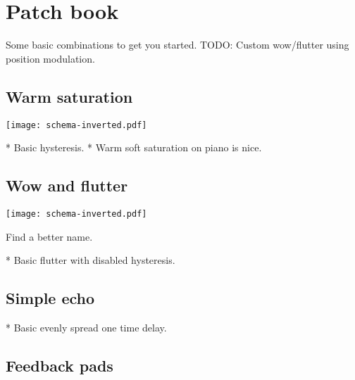 \documentclass[11pt]{article}
\begin{document}
\newpage

\section{Patch book}

Some basic combinations to get you started. TODO: Custom wow/flutter using position modulation.

\vspace{5mm}
\noindent
\begin{minipage}[t]{0.45\textwidth}

\subsection{Warm saturation}

\vspace{5mm}
\begin{center}
  \texttt{[image: schema-inverted.pdf]}
\end{center}

* Basic hysteresis.
* Warm soft saturation on piano is nice.

\lipsum[1][1-2]
\end{minipage}%
\begin{minipage}{0.05\textwidth}
\phantom{ }
\end{minipage}%
\begin{minipage}[t]{0.45\textwidth}
\subsection{Wow and flutter}

\vspace{5mm}
\begin{center}
  \texttt{[image: schema-inverted.pdf]}
\end{center}

Find a better name.

* Basic flutter with disabled hysteresis.
\end{minipage}

\newpage


\subsection{Simple echo}

* Basic evenly spread one time delay.

\subsection{Feedback pads}
\end{document}
